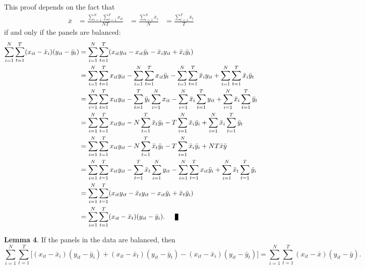 \documentclass{article}[12pt]
\newenvironment{proof}[1][Proof.]{\begin{trivlist}
\item[\hskip \labelsep {\bfseries #1}]}{\end{trivlist}}
\newcommand{\qed}{\nobreak \ifvmode \relax \else
      \ifdim\lastskip<1.5em \hskip-\lastskip
      \hskip1.5em plus0em minus0.5em \fi \nobreak
      \vrule height0.75em width0.5em depth0.25em\fi}
\begin{document}
\begin{proof}
This proof depends on the fact that 
\begin{equation}
\begin{array}{cccc}
\displaystyle\bar{x} & \displaystyle= \frac{\sum_{i=1}^N \sum_{t=1}^T x_{it}}{NT} &\displaystyle = \frac{\sum_{i=1}^N \bar{x}_{i}}{N} &\displaystyle = \frac{\sum_{t=1}^T \bar{x}_{t}}{T}
\end{array}
\end{equation}
if and only if the panels are balanced:
\begin{align}
\sum_{i=1}^N \sum_{t=1}^T(x_{it}  - \bar{x}_i)(y_{it} - \bar{y}_t)  & = \sum_{i=1}^N \sum_{t=1}^T(x_{it}y_{it} - x_{it}\bar{y}_t  - \bar{x}_iy_{it} + \bar{x}_i\bar{y}_t)\nonumber\\
& = \sum_{i=1}^N \sum_{t=1}^Tx_{it}y_{it} - \sum_{i=1}^N \sum_{t=1}^Tx_{it}\bar{y}_t  - \sum_{i=1}^N \sum_{t=1}^T\bar{x}_iy_{it} + \sum_{i=1}^N \sum_{t=1}^T\bar{x}_i\bar{y}_t\nonumber\\
& = \sum_{i=1}^N \sum_{t=1}^Tx_{it}y_{it} -  \sum_{t=1}^T\bar{y}_t\sum_{i=1}^Nx_{it}  - \sum_{i=1}^N \bar{x}_i\sum_{t=1}^Ty_{it} + \sum_{i=1}^N \bar{x}_i\sum_{t=1}^T\bar{y}_t\nonumber\\
& = \sum_{i=1}^N \sum_{t=1}^Tx_{it}y_{it} -  N\sum_{t=1}^T\bar{x}_{t}\bar{y}_t  - T\sum_{i=1}^N \bar{x}_i\bar{y}_{i} + \sum_{i=1}^N \bar{x}_i\sum_{t=1}^T\bar{y}_t\nonumber\\
& = \sum_{i=1}^N \sum_{t=1}^Tx_{it}y_{it} -  N\sum_{t=1}^T\bar{x}_{t}\bar{y}_t  - T\sum_{i=1}^N \bar{x}_i\bar{y}_{i} + NT \bar{x}\bar{y}\nonumber\\
& = \sum_{i=1}^N \sum_{t=1}^Tx_{it}y_{it} -  \sum_{t=1}^T\bar{x}_{t}\sum_{i=1}^N{y}_{it}  - \sum_{i=1}^N\sum_{t=1}^T x_{it}\bar{y}_{i} + \sum_{i=1}^N \bar{x}_t\sum_{t=1}^T\bar{y}_i\nonumber\\
& = \sum_{i=1}^N \sum_{t=1}^T(x_{it}y_{it} -  \bar{x}_{t}y_{it}  - x_{it}\bar{y}_{i} +  \bar{x}_t\bar{y}_i)\nonumber\\
& = \sum_{i=1}^N \sum_{t=1}^T(x_{it}-\bar{x}_t)(y_{it} -  \bar{y}_{i}).\qed
\end{align}
\end{proof}
\textbf{Lemma 4}. If the panels in the data are balanced, then
\begin{equation}
\sum_{i=1}^N \sum_{t=1}^T\Big[(x_{it}  - \bar{x}_i)(y_{it} - \bar{y}_i) + (x_{it}  - \bar{x}_t)(y_{it} - \bar{y}_t) - (x_{it}  - \bar{x}_i)(y_{it} - \bar{y}_t)\Big]  = \sum_{i=1}^N \sum_{t=1}^T(x_{it}  - \bar{x})(y_{it} - \bar{y}).
\end{equation}
\end{document}
